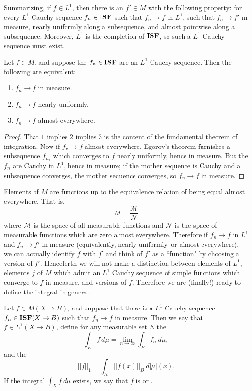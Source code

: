 \begin{subsec}
Summarizing, if $f \in L^1$, then there is an $f' \in M$ with the following property: for every $L^1$ Cauchy sequence $f_{n} \in \mathbf{ISF}$ such that $f_{n} \to f$ in $L^1$, such that $f_{n} \to f'$ in measure, nearly uniformly along a subsequence, and almost pointwise along a subsequence.
Moreover, $L^1$ is the completion of $\mathbf{ISF}$, so such a $L^1$ Cauchy sequence must exist.
\end{subsec}

\begin{corollary}
Let $f \in M$, and suppose the $f_{n} \in \mathbf{ISF}$ are an $L^1$ Cauchy sequence. Then the following are equivalent:
\begin{enumerate}
\item $f_{n} \to f$ in measure.
\item $f_{n} \to f$ nearly uniformly.
\item $f_{n} \to f$ almost everywhere.
\end{enumerate}
\end{corollary}
\begin{proof}
That $1$ implies $2$ implies $3$ is the content of the fundamental theorem of integration.
Now if $f_{n} \to f$ almost everywhere, Egorov's theorem furnishes a subsequence $f_{n_{k}}$ which converges to $f$ nearly uniformly, hence in measure.
But the $f_{n}$ are Cauchy in $L^1$, hence in measure; if the mother sequence is Cauchy and a subsequence converges, the mother sequence converges, so $f_{n} \to f$ in measure.
\end{proof}

\begin{subsec}
Elements of $M$ are functions up to the equivalence relation of being equal almost everywhere.
That is,
\[M = \frac{\mathcal M}{\mathcal N}\]
where $\mathcal M$ is the space of all measurable functions and $\mathcal N$ is the space of measurable functions which are zero almost everywhere.
Therefore if $f_{n} \to f$ in $L^1$ and $f_{n} \to f'$ in measure (equivalently, nearly uniformly, or almost everywhere), we can actually identify $f$ with $f'$ and think of $f'$ as a ``function" by choosing a version of $f'$.
Henceforth we will not make a distinction between elements of $L^1$, elements $f$ of $M$ which admit an $L^1$ Cauchy sequence of simple functions which converge to $f$ in measure, and versions of $f$.
Therefore we are (finally!) ready to define the integral in general.
\end{subsec}

\begin{definition}
Let $f \in M(X \to B)$, and suppose that there is a $L^1$ Cauchy sequence $f_{n} \in \mathbf{ISF}(X \to B)$ such that $f_{n} \to f$ in measure. Then we say that $f \in L^1(X \to B)$, define for any measurable set $E$ the 
\[\int_{E} f ~d\mu = \lim_{n \to \infty} \int_{E} f_{n}~d\mu,\]
and the 
\[||f||_1 = \int_{X} ||f(x)||_{B} ~d|\mu|(x).\]
If the integral $\int_{X} f~d\mu$ exists, we say that $f$ is  or .
\end{definition}

